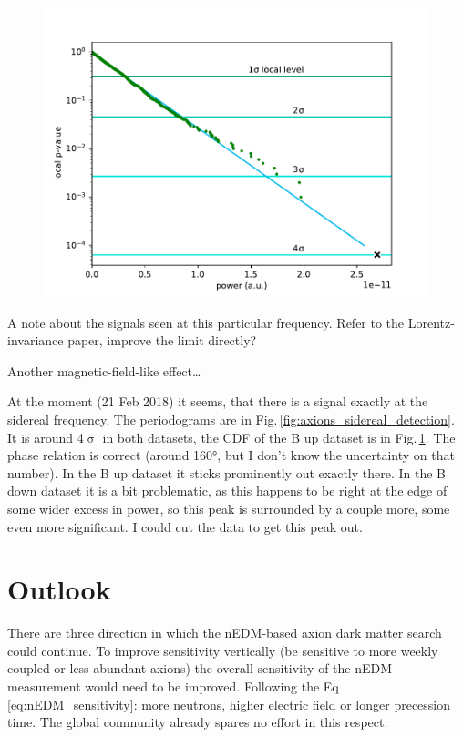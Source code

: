 \begin{figure}
  \centering
  \includegraphics[width=0.8\linewidth]{gfx/axions/winddeltah4mm_sidereal_detection.pdf}
  \caption{\cite{Romalis2009_NF}}\label{fig:axions_sidereal_cdf}
\end{figure}

A note about the signals seen at this particular frequency. Refer to the Lorentz-invariance paper, improve the limit directly?~\cite{ALTAREV20112365}

Another magnetic-field-like effect\ldots

At the moment (21 Feb 2018) it seems, that there is a signal exactly at the sidereal frequency. The periodograms are in Fig.\,\ref{fig:axions_sidereal_detection}. It is around 4$\upsigma$ in both datasets, the CDF of the B up dataset is in Fig.\,\ref{fig:axions_sidereal_cdf}. The phase relation is correct (around \ang{160}, but I don't know the uncertainty on that number). In the B up dataset it sticks prominently out exactly there. In the B down dataset it is a bit problematic, as this happens to be right at the edge of some wider excess in power, so this peak is surrounded by a couple more, some even more significant. I could cut the data to get this peak out. 



\section{Outlook}
There are three direction in which the nEDM-based axion dark matter search could continue.
To improve sensitivity vertically (be sensitive to more weekly coupled or less abundant axions) the overall sensitivity of the nEDM measurement would need to be improved.
Following the Eq\,\ref{eq:nEDM_sensitivity}: more neutrons, higher electric field or longer precession time.
The global community already spares no effort in this respect.

